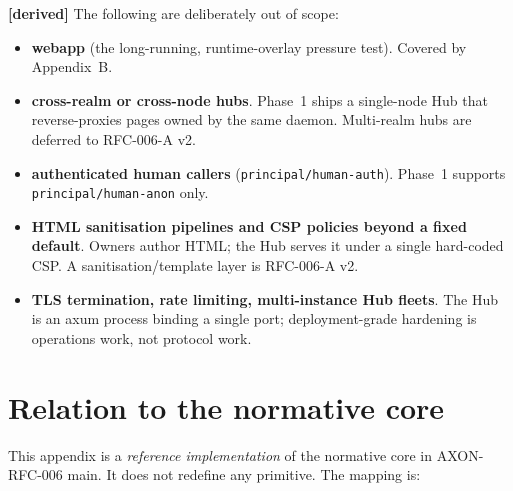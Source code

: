 \documentclass[11pt,a4paper]{article}
\newcommand{\derived}{\textcolor{derivedcolor}{\textbf{[derived]}}\xspace}
\theoremstyle{definition}
\begin{document}
\derived{} The following are deliberately out of scope:

\begin{itemize}[leftmargin=2.2em,itemsep=0.2em]
    \item \textbf{webapp} (the long-running, runtime-overlay
    pressure test). Covered by Appendix~B.
    \item \textbf{cross-realm or cross-node hubs}. Phase~1 ships
    a single-node Hub that reverse-proxies pages owned by the
    same daemon. Multi-realm hubs are deferred to RFC-006-A v2.
    \item \textbf{authenticated human callers}
    (\texttt{principal/human-auth}). Phase~1 supports
    \texttt{principal/human-anon} only.
    \item \textbf{HTML sanitisation pipelines and CSP policies
    beyond a fixed default}. Owners author HTML; the Hub serves
    it under a single hard-coded CSP. A sanitisation/template
    layer is RFC-006-A v2.
    \item \textbf{TLS termination, rate limiting, multi-instance
    Hub fleets}. The Hub is an axum process binding a single
    port; deployment-grade hardening is operations work, not
    protocol work.
\end{itemize}

\section{Relation to the normative core}
\label{sec:relation}

This appendix is a \emph{reference implementation} of the
normative core in AXON-RFC-006 main. It does not redefine any
primitive. The mapping is:
\end{document}
